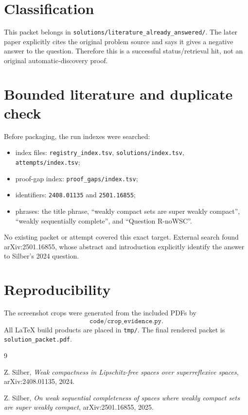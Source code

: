 \documentclass[11pt]{article}
\begin{document}
\section*{Classification}

This packet belongs in
\texttt{solutions/literature\_already\_answered/}. The later paper explicitly
cites the original problem source and says it gives a negative answer to the
question. Therefore this is a successful status/retrieval hit, not an original
automatic-discovery proof.

\section*{Bounded literature and duplicate check}

Before packaging, the run indexes were searched:
\begin{itemize}
\item index files: \texttt{registry\_index.tsv},
\texttt{solutions/index.tsv}, \texttt{attempts/index.tsv};
\item proof-gap index: \texttt{proof\_gaps/index.tsv};
\item identifiers: \texttt{2408.01135} and \texttt{2501.16855};
\item phrases: the title phrase, ``weakly compact sets are super weakly
compact'', ``weakly sequentially complete'', and ``Question R-noWSC''.
\end{itemize}
No existing packet or attempt covered this exact target. External search found
arXiv:2501.16855, whose abstract and introduction explicitly identify the
answer to Silber's 2024 question.

\section*{Reproducibility}

The screenshot crops were generated from the included PDFs by
\[
\texttt{code/crop\_evidence.py}.
\]
All LaTeX build products are placed in \texttt{tmp/}. The final rendered packet
is \texttt{solution\_packet.pdf}.

\begin{thebibliography}{9}

Z. Silber,
\emph{Weak compactness in Lipschitz-free spaces over superreflexive spaces},
arXiv:2408.01135, 2024.

Z. Silber,
\emph{On weak sequential completeness of spaces where weakly compact sets are super weakly compact},
arXiv:2501.16855, 2025.

\end{thebibliography}
\end{document}
